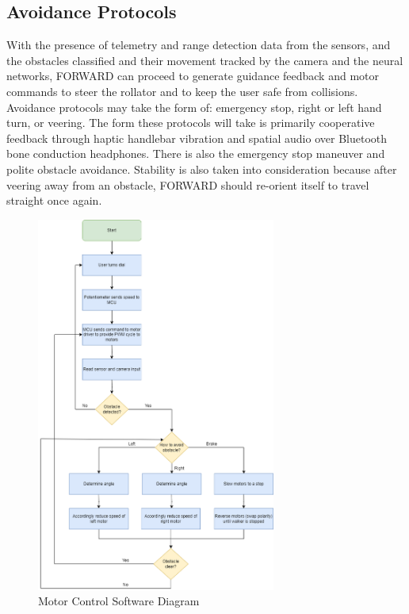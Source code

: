 \subsection{Avoidance Protocols}
\noindent With the presence of telemetry and range detection data from the sensors, and the obstacles classified and their movement tracked by the camera and the neural networks, FORWARD can proceed to generate guidance feedback and motor commands to steer the rollator and to keep the user safe from collisions. Avoidance protocols may take the form of: emergency stop, right or left hand turn, or veering. The form these protocols will take is primarily cooperative feedback through haptic handlebar vibration and spatial audio over Bluetooth bone conduction headphones. There is also the emergency stop maneuver and polite obstacle avoidance. Stability is also taken into consideration because after veering away from an obstacle, FORWARD should re-orient itself to travel straight once again.\\

\begin{figure}[H]
	\centering
	\includegraphics[width=0.7\textwidth]{./Images/motorsw.drawio.png}
	\caption{\label{fig:motorsw}Motor Control Software Diagram}
\end{figure}

